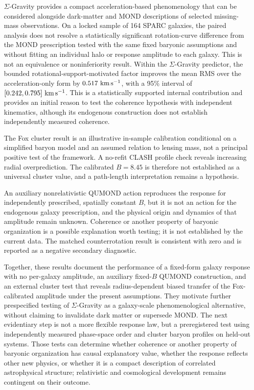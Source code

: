 \documentclass[aps,prd,reprint,superscriptaddress,showpacs,floatfix,longbibliography]{revtex4-2}
\begin{document}
$\Sigma$-Gravity provides a compact acceleration-based phenomenology that can be considered alongside dark-matter and MOND descriptions of selected missing-mass observations. On a locked sample of 164 SPARC galaxies, the paired analysis does not resolve a statistically significant rotation-curve difference from the MOND prescription tested with the same fixed baryonic assumptions and without fitting an individual halo or response amplitude to each galaxy. This is not an equivalence or noninferiority result. Within the $\Sigma$-Gravity predictor, the bounded rotational-support-motivated factor improves the mean RMS over the acceleration-only form by $0.517\ {\rm km\,s^{-1}}$, with a 95\% interval of $[0.242,0.795]\ {\rm km\,s^{-1}}$. This is a statistically supported internal contribution and provides an initial reason to test the coherence hypothesis with independent kinematics, although its endogenous construction does not establish independently measured coherence.

The Fox cluster result is an illustrative in-sample calibration conditional on a simplified baryon model and an assumed relation to lensing mass, not a principal positive test of the framework. A no-refit CLASH profile check reveals increasing radial overprediction. The calibrated $B=8.45$ is therefore not established as a universal cluster value, and a path-length interpretation remains a hypothesis.

An auxiliary nonrelativistic QUMOND action reproduces the response for independently prescribed, spatially constant $B$, but it is not an action for the endogenous galaxy prescription, and the physical origin and dynamics of that amplitude remain unknown. Coherence or another property of baryonic organization is a possible explanation worth testing; it is not established by the current data. The matched counterrotation result is consistent with zero and is reported as a negative secondary diagnostic.

Together, these results document the performance of a fixed-form galaxy response with no per-galaxy amplitude, an auxiliary fixed-$B$ QUMOND construction, and an external cluster test that reveals radius-dependent biased transfer of the Fox-calibrated amplitude under the present assumptions. They motivate further prespecified testing of $\Sigma$-Gravity as a galaxy-scale phenomenological alternative, without claiming to invalidate dark matter or supersede MOND. The next evidentiary step is not a more flexible response law, but a preregistered test using independently measured phase-space order and cluster baryon profiles on held-out systems. Those tests can determine whether coherence or another property of baryonic organization has causal explanatory value, whether the response reflects other new physics, or whether it is a compact description of correlated astrophysical structure; relativistic and cosmological development remains contingent on their outcome.
\end{document}
